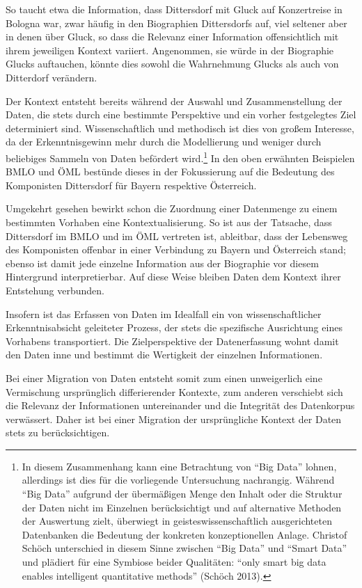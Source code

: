 \documentclass[a4paper,
fontsize=11pt,
oneside,
numbers=noperiodatend,
parskip=half-,
bibliography=totoc,
final
]{scrartcl}
\begin{document}
So taucht etwa die Information, dass Dittersdorf mit Gluck auf
Konzertreise in Bologna war, zwar häufig in den Biographien Dittersdorfs
auf, viel seltener aber in denen über Gluck, so dass die Relevanz einer
Information offensichtlich mit ihrem jeweiligen Kontext variiert.
Angenommen, sie würde in der Biographie Glucks auftauchen, könnte dies
sowohl die Wahrnehmung Glucks als auch von Ditterdorf verändern.

Der Kontext entsteht bereits während der Auswahl und Zusammenstellung
der Daten, die stets durch eine bestimmte Perspektive und ein vorher
festgelegtes Ziel determiniert sind. Wissenschaftlich und methodisch ist
dies von großem Interesse, da der Erkenntnisgewinn mehr durch die
Modellierung und weniger durch beliebiges Sammeln von Daten befördert
wird.\footnote{In diesem Zusammenhang kann eine Betrachtung von
  \enquote{Big Data} lohnen, allerdings ist dies für die vorliegende
  Untersuchung nachrangig. Während \enquote{Big Data} aufgrund der
  übermäßigen Menge den Inhalt oder die Struktur der Daten nicht im
  Einzelnen berücksichtigt und auf alternative Methoden der Auswertung
  zielt, überwiegt in geisteswissenschaftlich ausgerichteten Datenbanken
  die Bedeutung der konkreten konzeptionellen Anlage. Christof Schöch
  unterschied in diesem Sinne zwischen \enquote{Big Data} und
  \enquote{Smart Data} und plädiert für eine Symbiose beider Qualitäten:
  \enquote{only smart big data enables intelligent quantitative methods}
  (Schöch 2013).} In den oben erwähnten Beispielen BMLO und ÖML bestünde
dieses in der Fokussierung auf die Bedeutung des Komponisten Dittersdorf
für Bayern respektive Österreich.

Umgekehrt gesehen bewirkt schon die Zuordnung einer Datenmenge zu einem
bestimmten Vorhaben eine Kontextualisierung. So ist aus der Tatsache,
dass Dittersdorf im BMLO und im ÖML vertreten ist, ableitbar, dass der
Lebensweg des Komponisten offenbar in einer Verbindung zu Bayern und
Österreich stand; ebenso ist damit jede einzelne Information aus der
Biographie vor diesem Hintergrund interpretierbar. Auf diese Weise
bleiben Daten dem Kontext ihrer Entstehung verbunden.

Insofern ist das Erfassen von Daten im Idealfall ein von
wissenschaftlicher Erkenntnisabsicht geleiteter Prozess, der stets die
spezifische Ausrichtung eines Vorhabens transportiert. Die
Zielperspektive der Datenerfassung wohnt damit den Daten inne und
bestimmt die Wertigkeit der einzelnen Informationen.

Bei einer Migration von Daten entsteht somit zum einen unweigerlich eine
Vermischung ursprünglich differierender Kontexte, zum anderen verschiebt
sich die Relevanz der Informationen untereinander und die Integrität des
Datenkorpus verwässert. Daher ist bei einer Migration der ursprüngliche
Kontext der Daten stets zu berücksichtigen.
\end{document}
